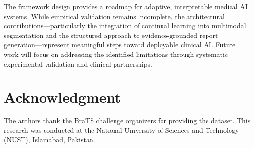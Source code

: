 \documentclass[conference]{IEEEtran}
\begin{document}
The framework design provides a roadmap for adaptive, interpretable medical AI systems. While empirical validation remains incomplete, the architectural contributions—particularly the integration of continual learning into multimodal segmentation and the structured approach to evidence-grounded report generation—represent meaningful steps toward deployable clinical AI. Future work will focus on addressing the identified limitations through systematic experimental validation and clinical partnerships.

\section*{Acknowledgment}

The authors thank the BraTS challenge organizers for providing the dataset. This research was conducted at the National University of Sciences and Technology (NUST), Islamabad, Pakistan.



\end{document}
